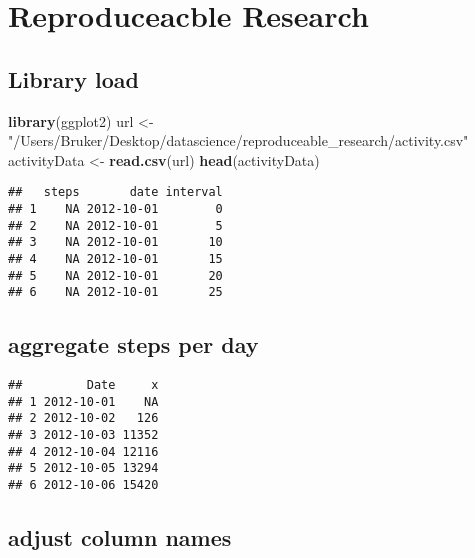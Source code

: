 \documentclass[]{article}
\title{}
\author{}
\date{}
\newenvironment{Shaded}{\begin{snugshade}}{\end{snugshade}}
\newcommand{\KeywordTok}[1]{\textcolor[rgb]{0.13,0.29,0.53}{\textbf{#1}}}
\newcommand{\DataTypeTok}[1]{\textcolor[rgb]{0.13,0.29,0.53}{#1}}
\newcommand{\StringTok}[1]{\textcolor[rgb]{0.31,0.60,0.02}{#1}}
\newcommand{\OperatorTok}[1]{\textcolor[rgb]{0.81,0.36,0.00}{\textbf{#1}}}
\newcommand{\NormalTok}[1]{#1}
\begin{document}
\section{Reproduceacble Research}\label{reproduceacble-research}

\subsection{Library load}\label{library-load}

\begin{Shaded}
\begin{Highlighting}[]
\KeywordTok{library}\NormalTok{(ggplot2)}
\NormalTok{url <-}\StringTok{ "/Users/Bruker/Desktop/datascience/reproduceable_research/activity.csv"}
\NormalTok{activityData <-}\StringTok{ }\KeywordTok{read.csv}\NormalTok{(url)}
\KeywordTok{head}\NormalTok{(activityData)}
\end{Highlighting}
\end{Shaded}

\begin{verbatim}
##   steps       date interval
## 1    NA 2012-10-01        0
## 2    NA 2012-10-01        5
## 3    NA 2012-10-01       10
## 4    NA 2012-10-01       15
## 5    NA 2012-10-01       20
## 6    NA 2012-10-01       25
\end{verbatim}

\subsection{aggregate steps per day}\label{aggregate-steps-per-day}

\begin{Shaded}
\end{Shaded}

\begin{verbatim}
##         Date     x
## 1 2012-10-01    NA
## 2 2012-10-02   126
## 3 2012-10-03 11352
## 4 2012-10-04 12116
## 5 2012-10-05 13294
## 6 2012-10-06 15420
\end{verbatim}

\subsection{adjust column names}\label{adjust-column-names}
\end{document}
